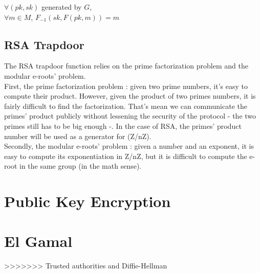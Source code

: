 \begin{mytheorem}
	$\forall (pk,sk) $ generated by $G$, \\
	$\forall m \in M $, $F_{-1}( sk, F(pk, m) ) = m $
\end{mytheorem}

\subsection{RSA Trapdoor}

The RSA trapdoor function relies on the prime factorization problem and the modular e-roots' problem. \\
First, the prime factorization problem : given two prime numbers, it's easy to compute their product. However, given the product of two primes numbers, it is fairly difficult to find the factorization. That's mean we can communicate the primes' product publicly without lessening the security of the protocol - the two primes still has to be big enough -. In the case of RSA, the primes' product number will be used as a generator for (Z/nZ).\\
Secondly, the modular e-roots' problem : given a number and an exponent, it is easy to compute its exponentiation in Z/nZ, but it is difficult to compute the e-root in the same group (in the math sense).


\section{Public Key Encryption}








\section{El Gamal}







>>>>>>> Trusted authorities and Diffie-Hellman
